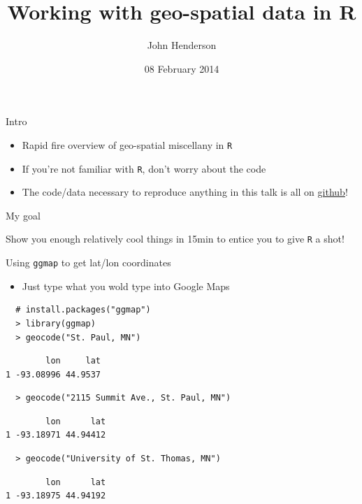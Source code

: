 \documentclass[sans,aspectratio=169,presentation,bigger,fleqn]{beamer}
\author{John Henderson}
\date{08 February 2014}
\title{Working with geo-spatial data in R}
\begin{document}
\maketitle


\begin{frame}[fragile,label=sec-1]{Intro}
 \begin{itemize}
\item Rapid fire overview of geo-spatial miscellany in \texttt{R}
\item If you're not familiar with \texttt{R}, don't worry about the code
\item The code/data necessary to reproduce anything in this talk is all on \href{https://github.com/jwhendy/devFest-geo}{github}!
\end{itemize}

\vspace{1cm} \pause

\alert{My goal}

Show you enough relatively cool things in 15min to entice you to give \texttt{R} a shot!
\end{frame}

\begin{frame}[fragile,label=sec-2]{Using \texttt{ggmap} to get lat/lon coordinates}
 \begin{itemize}
\item Just type what you wold type into Google Maps
\end{itemize}


\scriptsize

\begin{verbatim}
  # install.packages("ggmap")
  > library(ggmap)
  > geocode("St. Paul, MN")
\end{verbatim}

\begin{verbatim}
        lon     lat
1 -93.08996 44.9537
\end{verbatim}


\begin{verbatim}
  > geocode("2115 Summit Ave., St. Paul, MN")
\end{verbatim}

\begin{verbatim}
        lon      lat
1 -93.18971 44.94412
\end{verbatim}

\begin{verbatim}
  > geocode("University of St. Thomas, MN")
\end{verbatim}

\begin{verbatim}
        lon      lat
1 -93.18975 44.94192
\end{verbatim}

\normalsize
\end{frame}
\end{document}
